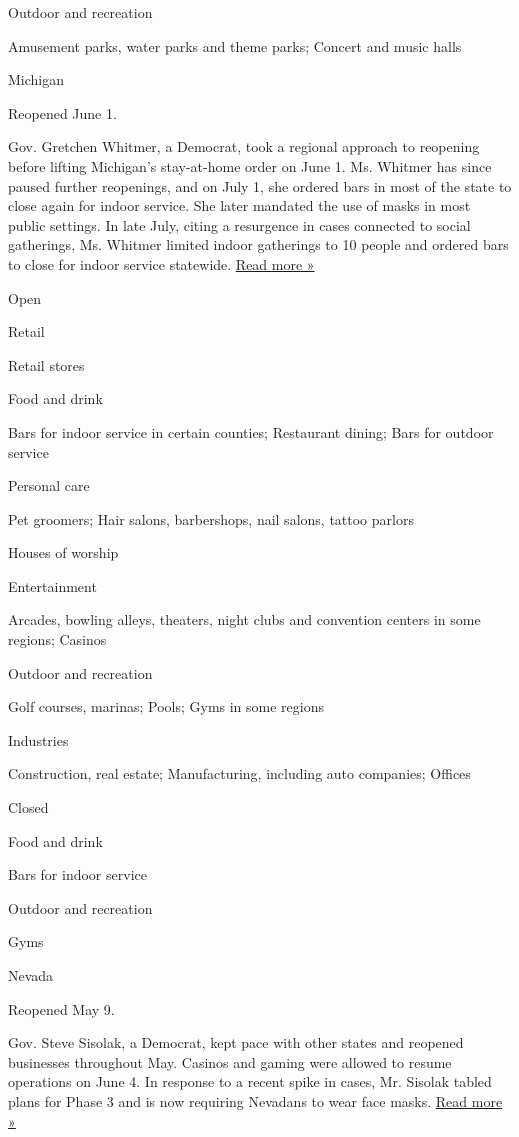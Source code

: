 Outdoor and recreation

Amusement parks, water parks and theme parks; Concert and music halls

Michigan

Reopened June 1.

Gov. Gretchen Whitmer, a Democrat, took a regional approach to reopening
before lifting Michigan's stay-at-home order on June 1. Ms. Whitmer has
since paused further reopenings, and on July 1, she ordered bars in most
of the state to close again for indoor service. She later mandated the
use of masks in most public settings. In late July, citing a resurgence
in cases connected to social gatherings, Ms. Whitmer limited indoor
gatherings to 10 people and ordered bars to close for indoor service
statewide.
\href{https://www.freep.com/story/news/local/michigan/2020/07/29/detroit-casinos-reopening-michigan-restrictions/5537945002/}{Read
more »}

Open

Retail

Retail stores

Food and drink

Bars for indoor service in certain counties; Restaurant dining; Bars for
outdoor service

Personal care

Pet groomers; Hair salons, barbershops, nail salons, tattoo parlors

Houses of worship

Entertainment

Arcades, bowling alleys, theaters, night clubs and convention centers in
some regions; Casinos

Outdoor and recreation

Golf courses, marinas; Pools; Gyms in some regions

Industries

Construction, real estate; Manufacturing, including auto companies;
Offices

Closed

Food and drink

Bars for indoor service

Outdoor and recreation

Gyms

Nevada

Reopened May 9.

Gov. Steve Sisolak, a Democrat, kept pace with other states and reopened
businesses throughout May. Casinos and gaming were allowed to resume
operations on June 4. In response to a recent spike in cases, Mr.
Sisolak tabled plans for Phase 3 and is now requiring Nevadans to wear
face masks.
\href{https://www.rgj.com/story/news/2020/07/27/sisolak-announcement-live-covid-nevada-coronavirus-update/5523115002/}{Read
more »}


